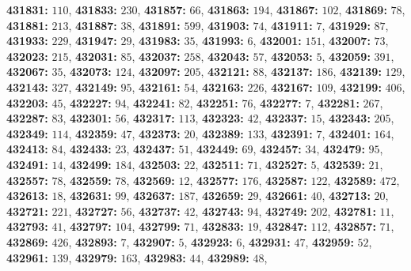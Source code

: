 \textsf{\bfseries 431831:} $110$, \textsf{\bfseries 431833:} $230$, \textsf{\bfseries 431857:} $66$, \textsf{\bfseries 431863:} $194$, \textsf{\bfseries 431867:} $102$, \textsf{\bfseries 431869:} $78$, \textsf{\bfseries 431881:} $213$, \textsf{\bfseries 431887:} $38$, \textsf{\bfseries 431891:} $599$, \textsf{\bfseries 431903:} $74$, \textsf{\bfseries 431911:} $7$, \textsf{\bfseries 431929:} $87$, \textsf{\bfseries 431933:} $229$, \textsf{\bfseries 431947:} $29$, \textsf{\bfseries 431983:} $35$, \textsf{\bfseries 431993:} $6$, \textsf{\bfseries 432001:} $151$, \textsf{\bfseries 432007:} $73$, \textsf{\bfseries 432023:} $215$, \textsf{\bfseries 432031:} $85$, \textsf{\bfseries 432037:} $258$, \textsf{\bfseries 432043:} $57$, \textsf{\bfseries 432053:} $5$, \textsf{\bfseries 432059:} $391$, \textsf{\bfseries 432067:} $35$, \textsf{\bfseries 432073:} $124$, \textsf{\bfseries 432097:} $205$, \textsf{\bfseries 432121:} $88$, \textsf{\bfseries 432137:} $186$, \textsf{\bfseries 432139:} $129$, \textsf{\bfseries 432143:} $327$, \textsf{\bfseries 432149:} $95$, \textsf{\bfseries 432161:} $54$, \textsf{\bfseries 432163:} $226$, \textsf{\bfseries 432167:} $109$, \textsf{\bfseries 432199:} $406$, \textsf{\bfseries 432203:} $45$, \textsf{\bfseries 432227:} $94$, \textsf{\bfseries 432241:} $82$, \textsf{\bfseries 432251:} $76$, \textsf{\bfseries 432277:} $7$, \textsf{\bfseries 432281:} $267$, \textsf{\bfseries 432287:} $83$, \textsf{\bfseries 432301:} $56$, \textsf{\bfseries 432317:} $113$, \textsf{\bfseries 432323:} $42$, \textsf{\bfseries 432337:} $15$, \textsf{\bfseries 432343:} $205$, \textsf{\bfseries 432349:} $114$, \textsf{\bfseries 432359:} $47$, \textsf{\bfseries 432373:} $20$, \textsf{\bfseries 432389:} $133$, \textsf{\bfseries 432391:} $7$, \textsf{\bfseries 432401:} $164$, \textsf{\bfseries 432413:} $84$, \textsf{\bfseries 432433:} $23$, \textsf{\bfseries 432437:} $51$, \textsf{\bfseries 432449:} $69$, \textsf{\bfseries 432457:} $34$, \textsf{\bfseries 432479:} $95$, \textsf{\bfseries 432491:} $14$, \textsf{\bfseries 432499:} $184$, \textsf{\bfseries 432503:} $22$, \textsf{\bfseries 432511:} $71$, \textsf{\bfseries 432527:} $5$, \textsf{\bfseries 432539:} $21$, \textsf{\bfseries 432557:} $78$, \textsf{\bfseries 432559:} $78$, \textsf{\bfseries 432569:} $12$, \textsf{\bfseries 432577:} $176$, \textsf{\bfseries 432587:} $122$, \textsf{\bfseries 432589:} $472$, \textsf{\bfseries 432613:} $18$, \textsf{\bfseries 432631:} $99$, \textsf{\bfseries 432637:} $187$, \textsf{\bfseries 432659:} $29$, \textsf{\bfseries 432661:} $40$, \textsf{\bfseries 432713:} $20$, \textsf{\bfseries 432721:} $221$, \textsf{\bfseries 432727:} $56$, \textsf{\bfseries 432737:} $42$, \textsf{\bfseries 432743:} $94$, \textsf{\bfseries 432749:} $202$, \textsf{\bfseries 432781:} $11$, \textsf{\bfseries 432793:} $41$, \textsf{\bfseries 432797:} $104$, \textsf{\bfseries 432799:} $71$, \textsf{\bfseries 432833:} $19$, \textsf{\bfseries 432847:} $112$, \textsf{\bfseries 432857:} $71$, \textsf{\bfseries 432869:} $426$, \textsf{\bfseries 432893:} $7$, \textsf{\bfseries 432907:} $5$, \textsf{\bfseries 432923:} $6$, \textsf{\bfseries 432931:} $47$, \textsf{\bfseries 432959:} $52$, \textsf{\bfseries 432961:} $139$, \textsf{\bfseries 432979:} $163$, \textsf{\bfseries 432983:} $44$, \textsf{\bfseries 432989:} $48$, 
